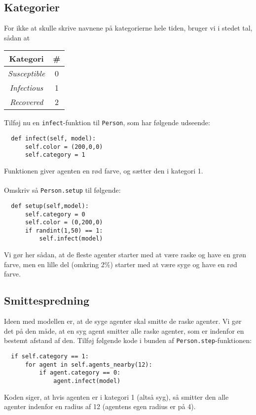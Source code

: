 \documentclass{article}
\begin{document}
\subsection{Kategorier}
For ikke at skulle skrive navnene på kategorierne hele tiden, bruger vi i stedet tal, sådan at
\begin{center}
  \begin{tabular}{| c c |}
    \hline
    \textbf{Kategori} & \textbf{\#} \\ \hline \hline
    \textit{Susceptible} & 0\\ \hline
    \textit{Infectious} & 1\\ \hline
    \textit{Recovered} & 2\\ \hline
\end{tabular}
\end{center}
Tilføj nu en \texttt{infect}-funktion til \texttt{Person}, som har følgende udseende:
\begin{lstlisting}
  def infect(self, model):
      self.color = (200,0,0)
      self.category = 1
\end{lstlisting}
Funktionen giver agenten en rød farve, og sætter den i kategori 1.\\\\
Omskriv så \texttt{Person.setup} til følgende:
\begin{lstlisting}
  def setup(self,model):
      self.category = 0
      self.color = (0,200,0)
      if randint(1,50) == 1:
          self.infect(model)
\end{lstlisting}
Vi gør her sådan, at de fleste agenter starter med at være raske og have en grøn farve, men en lille del (omkring 2\%) starter med at være syge og have en rød farve.

\subsection{Smittespredning}
Ideen med modellen er, at de syge agenter skal smitte de raske agenter. Vi gør det på den måde, at en syg agent smitter alle raske agenter, som er indenfor en bestemt afstand af den. Tilføj følgende kode i bunden af \texttt{Person.step}-funktionen:
\begin{lstlisting}
  if self.category == 1:
      for agent in self.agents_nearby(12):
          if agent.category == 0:
              agent.infect(model)
\end{lstlisting}
Koden siger, at hvis agenten er i kategori 1 (altså syg), så smitter den alle agenter indenfor en radius af 12 (agentens egen radius er på 4).
\end{document}
